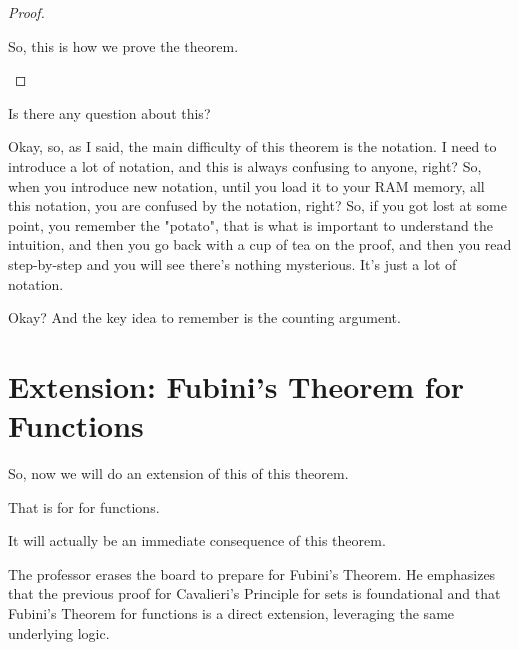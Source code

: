 \begin{proof}
\begin{spoken-clean}[00:15:39 - 00:15:42]
So, this is how we prove the theorem.
\end{spoken-clean}

\end{proof}

\begin{spoken-clean}[00:15:46 - 00:15:47]
Is there any question about this?
\end{spoken-clean}

\begin{spoken-clean}[00:16:00 - 00:16:21]
Okay, so, as I said, the main difficulty of this theorem is the notation. I need to introduce a lot of notation, and this is always confusing to anyone, right? So, when you introduce new notation, until you load it to your RAM memory, all this notation, you are confused by the notation, right? So, if you got lost at some point, you remember the "potato", that is what is important to understand the intuition, and then you go back with a cup of tea on the proof, and then you read step-by-step and you will see there's nothing mysterious. It's just a lot of notation.
\end{spoken-clean}

\begin{spoken-clean}[00:16:21 - 00:16:22]
Okay? And the key idea to remember is the counting argument.
\end{spoken-clean}

\section{Extension: Fubini's Theorem for Functions}

\begin{spoken-clean}[00:16:22 - 00:16:27]
So, now we will do an extension of this of this theorem.
\end{spoken-clean}

\begin{spoken-clean}[00:16:27 - 00:16:28]
That is for for functions.
\end{spoken-clean}

\begin{spoken-clean}[00:16:28 - 00:16:32]
It will actually be an immediate consequence of this theorem.
\end{spoken-clean}

\begin{math-stroke}
\begin{center}
\vspace{1cm} %
\end{center}
\begin{explanation-of-steps}
The professor erases the board to prepare for Fubini's Theorem. He emphasizes that the previous proof for Cavalieri's Principle for sets is foundational and that Fubini's Theorem for functions is a direct extension, leveraging the same underlying logic.
\end{explanation-of-steps}
\end{math-stroke}

